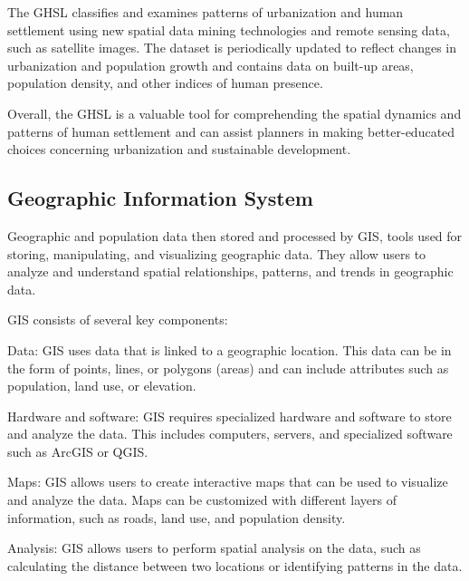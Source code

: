 \documentclass[12pt]{report}
\begin{document}
            The GHSL classifies and examines patterns of urbanization and human settlement using new spatial data mining
            technologies and remote sensing data, such as satellite images. The dataset is periodically updated to
            reflect changes in urbanization and population growth and contains data on built-up areas, population
            density, and other indices of human presence.

            Overall, the GHSL is a valuable tool for comprehending the spatial dynamics and patterns of human settlement
            and can assist planners in making better-educated choices concerning urbanization and sustainable
            development.

        \subsection{Geographic Information System}
            Geographic and population data then stored and processed by \ac{GIS}, tools used
            for storing, manipulating, and visualizing geographic data. They allow users to analyze and understand spatial
            relationships, patterns, and trends in geographic data. 
            
            GIS consists of several key components:
            \begin{myitemize}
                \item Data: GIS uses data that is linked to a geographic location. This data can be in the form of
                points, lines, or polygons (areas) and can include attributes such as population, land use, or
                elevation.
                \item Hardware and software: GIS requires specialized hardware and software to store and analyze the
                data. This includes computers, servers, and specialized software such as ArcGIS or QGIS.
                \item Maps: GIS allows users to create interactive maps that can be used to visualize and analyze the
                data. Maps can be customized with different layers of information, such as roads, land use, and
                population density.
                \item Analysis: GIS allows users to perform spatial analysis on the data, such as calculating the
                distance between two locations or identifying patterns in the data.
            \end{myitemize}
\end{document}
